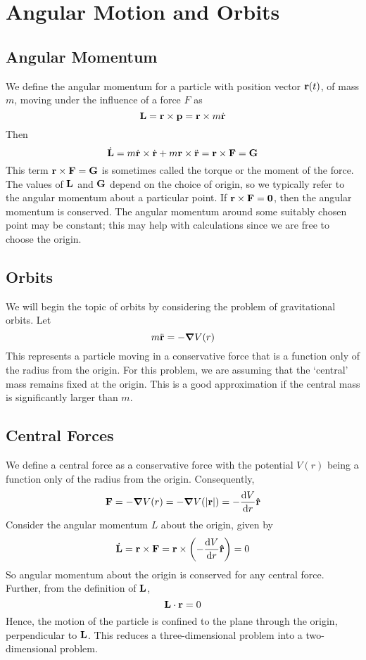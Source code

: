 \documentclass{article}
\begin{document}
\section{Angular Motion and Orbits}
\subsection{Angular Momentum}
We define the angular momentum for a particle with position vector $\vb r(t)$, of mass $m$, moving under the influence of a force $F$ as
\[ \vb L = \vb r \times \vb p = \vb r \times m \dot{\vb r} \]
Then
\[ \dot{\vb L} = m\dot{\vb r} \times \dot{\vb r} + m\vb r \times \ddot{\vb r} = \vb r \times \vb F = \vb G \]
This term $\vb r \times \vb F = \vb G$ is sometimes called the torque or the moment of the force. The values of $\vb L$ and $\vb G$ depend on the choice of origin, so we typically refer to the angular momentum about a particular point. If $\vb r \times \vb F = \vb 0$, then the angular momentum is conserved. The angular momentum around some suitably chosen point may be constant; this may help with calculations since we are free to choose the origin.

\subsection{Orbits}
We will begin the topic of orbits by considering the problem of gravitational orbits. Let
\[ m\ddot{\vb r} = -\grad V(r) \]
This represents a particle moving in a conservative force that is a function only of the radius from the origin. For this problem, we are assuming that the `central' mass remains fixed at the origin. This is a good approximation if the central mass is significantly larger than $m$.

\subsection{Central Forces}
We define a central force as a conservative force with the potential $V(r)$ being a function only of the radius from the origin. Consequently,
\[ \vb F = -\grad V(r) = -\grad V(\abs{\vb r}) = -\frac{\dd{V}}{\dd{r}}\vu{r} \]
Consider the angular momentum $L$ about the origin, given by
\[ \dot{\vb L} = \vb r \times \vb F = \vb r \times \left(-\frac{\dd{V}}{\dd{r}}\vu{r}\right) = 0 \]
So angular momentum about the origin is conserved for any central force. Further, from the definition of $\vb L$,
\[ \vb L \cdot \vb r = 0 \]
Hence, the motion of the particle is confined to the plane through the origin, perpendicular to $\vb L$. This reduces a three-dimensional problem into a two-dimensional problem.
\end{document}
